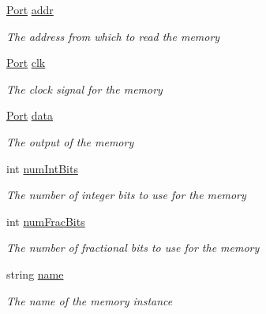 \begin{DoxyCompactItemize}
\item 
\hyperlink{class_n_n_gen_1_1_port}{Port} \hyperlink{class_n_n_gen_1_1_sync_transfer_function_mem_a842f5ef77e0b13f7e5a91b69fb10880b}{addr}
\begin{DoxyCompactList}\small\item\em The address from which to read the memory \end{DoxyCompactList}\item 
\hyperlink{class_n_n_gen_1_1_port}{Port} \hyperlink{class_n_n_gen_1_1_sync_transfer_function_mem_a39eac2d524a3ed0d3e55762373f3879c}{clk}
\begin{DoxyCompactList}\small\item\em The clock signal for the memory \end{DoxyCompactList}\item 
\hyperlink{class_n_n_gen_1_1_port}{Port} \hyperlink{class_n_n_gen_1_1_sync_transfer_function_mem_a1afdcfbaa9233adc7673c2a59724accb}{data}
\begin{DoxyCompactList}\small\item\em The output of the memory \end{DoxyCompactList}\item 
int \hyperlink{class_n_n_gen_1_1_sync_transfer_function_mem_ac004657938e8276bfcaf430399237501}{num\+Int\+Bits}
\begin{DoxyCompactList}\small\item\em The number of integer bits to use for the memory \end{DoxyCompactList}\item 
int \hyperlink{class_n_n_gen_1_1_sync_transfer_function_mem_ae036daf729a3381857761582bb573498}{num\+Frac\+Bits}
\begin{DoxyCompactList}\small\item\em The number of fractional bits to use for the memory \end{DoxyCompactList}\item 
string \hyperlink{class_n_n_gen_1_1_sync_transfer_function_mem_adb5f86e770954ca55c554848ea65a5f8}{name}
\begin{DoxyCompactList}\small\item\em The name of the memory instance \end{DoxyCompactList}\end{DoxyCompactItemize}


